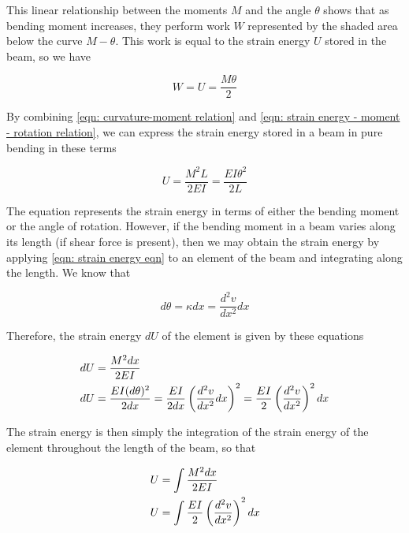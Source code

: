 \documentclass[
10pt,
a4paper,
openany,
svgnames,
]{book} %
\begin{document}
This linear relationship between the moments $M$ and the angle $\theta$ shows that as bending moment increases, they perform work $W$ represented by the shaded area below the curve $M-\theta$. This work is equal to the strain energy $U$ stored in the beam, so we have

\begin{equation} \label{eqn: strain energy - moment - rotation relation}
  W = U = \frac{M\theta}{2}
\end{equation}

By combining \cref{eqn: curvature-moment relation} and \cref{eqn: strain energy - moment - rotation relation}, we can express the strain energy stored in a beam in pure bending in these terms

\begin{equation} \label{eqn: strain energy eqn}
  U = \frac{M^2L}{2EI} = \frac{EI\theta ^2}{2L}
\end{equation}

The equation represents the strain energy in terms of either the bending moment or the angle of rotation. However, if the bending moment in a beam varies along its length (if shear force is present), then we may obtain the strain energy by applying \cref{eqn: strain energy eqn} to an element of the beam and integrating along the length. We know that

\[d\theta  = \kappa dx = \frac{{{d^2}v}}{{d{x^2}}}dx\]

Therefore, the strain energy $dU$ of the element is given by these equations

\[\begin{gathered}
  dU = \frac{M^2dx}{2EI} \hfill \\
  dU = \frac{EI(d\theta )^2}{2dx} = \frac{EI}{2dx}\left( \frac{d^2v}{dx^2}dx \right)^2 = \frac{EI}{2}\left( \frac{d^2v}{dx^2} \right)^2dx \hfill \\ 
\end{gathered} \]

The strain energy is then simply the integration of the strain energy of the element throughout the length of the beam, so that

\begin{equation}
  \begin{gathered}
    U = \int \frac{M^2dx}{2EI}  \hfill \\
    U = \int \frac{EI}{2} \left( \frac{d^2v}{dx^2} \right)^2dx  \hfill \\ 
  \end{gathered}
\end{equation}
\end{document}
